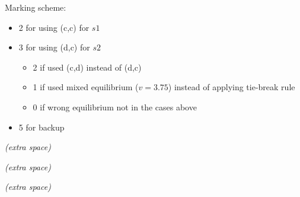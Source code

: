 \begin{solution}
Marking scheme:
\begin{itemize}
\item 2 for using (c,c) for $s1$
\item 3 for using (d,c) for $s2$
\begin{itemize}
\item 2 if used (c,d) instead of (d,c)
\item 1 if used mixed equilibrium ($v=3.75$) instead of applying tie-break rule
\item 0 if wrong equilibrium not in the cases above 
\end{itemize}
\item 5 for backup
\end{itemize}
\end{solution}

\clearpage

\begin{center}
    \textit{(extra space)}
\end{center}

\clearpage

\begin{center}
    \textit{(extra space)}
\end{center}

\clearpage

\begin{center}
    \textit{(extra space)}
\end{center}
